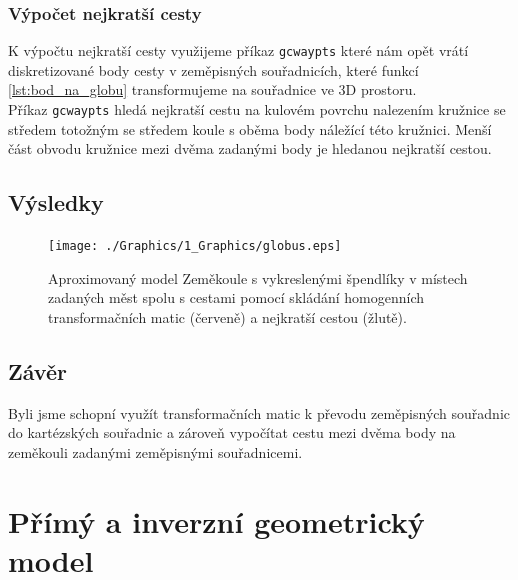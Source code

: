 \documentclass{article}
\begin{document}
			\subsubsection{Výpočet nejkratší cesty}
				K výpočtu nejkratší cesty využijeme příkaz \verb|gcwaypts| které nám opět vrátí diskretizované body cesty v zeměpisných souřadnicích, které funkcí \ref{lst:bod_na_globu} transformujeme na souřadnice ve 3D prostoru.\\
				
				Příkaz \verb|gcwaypts| hledá nejkratší cestu na kulovém povrchu nalezením kružnice se středem totožným se středem koule s oběma body náležící této kružnici. Menší část obvodu kružnice mezi dvěma zadanými body je hledanou nejkratší cestou.
		\subsection{Výsledky}
			\begin{figure}[H]
				\centering
				\texttt{[image: ./Graphics/1\_Graphics/globus.eps]}
				\caption{Aproximovaný model Zeměkoule s vykreslenými špendlíky v místech zadaných měst spolu s cestami pomocí skládání homogenních transformačních matic (červeně) a nejkratší cestou (žlutě).}
				\label{pic:1_globus}
			\end{figure}
		\subsection{Závěr}
			Byli jsme schopní využít transformačních matic k převodu zeměpisných souřadnic do kartézských souřadnic a zároveň vypočítat cestu mezi dvěma body na zeměkouli zadanými zeměpisnými souřadnicemi. 
	\newpage
	\section{Přímý a inverzní geometrický model}
		\label{section:2}
\end{document}
